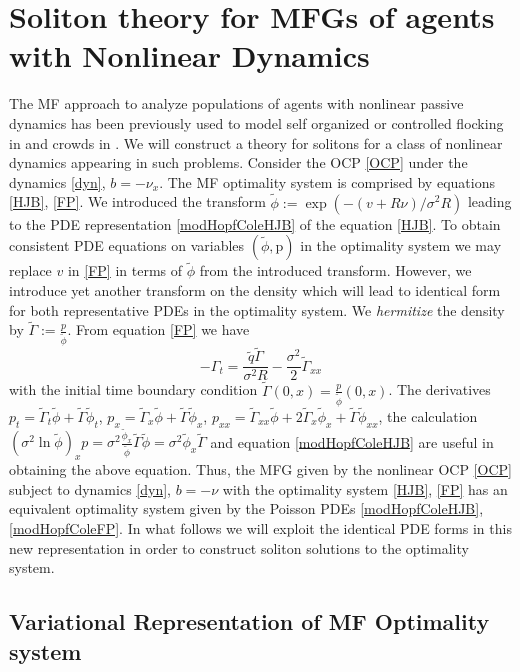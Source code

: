 \documentclass[letterpaper, 12pt]{article}
\newcommand{\rp}{{\mathrm p}}
\newcommand{\tilGamma}{\tilde{\Gamma}}
\newcommand{\tilphi}{\tilde{\phi}}
\begin{document}
\section{Soliton theory for MFGs of agents with Nonlinear Dynamics}
\label{sec:solitonnonlinearMFG}


The MF approach to analyze populations of agents with nonlinear passive dynamics has been previously used to model self organized or controlled flocking in \cite{barbaro2016phase, Bakshi2018Chaos} and crowds in \cite{Burger2011}. We will construct a theory for solitons for a class of nonlinear dynamics appearing in such problems. Consider the OCP \eqref{OCP} under the dynamics \eqref{dyn}, $b = -\nu_x$. The MF optimality system is comprised by equations \eqref{HJB}, \eqref{FP}. We introduced the transform $\tilde{\phi} := \exp(-(v + R\nu)/\sigma^2 R)$ leading to the PDE representation \eqref{modHopfColeHJB} of the equation \eqref{HJB}. To obtain consistent PDE equations on variables $(\tilde{\phi},\rp)$ in the optimality system we may replace $v$ in \eqref{FP} in terms of $\tilde{\phi}$ from the introduced transform. However, we introduce yet another transform on the density which will lead to identical form for both representative PDEs in the optimality system. We \textit{hermitize} \cite{Ullmo2017} the density by $\tilde{\Gamma} := \frac{p}{\tilde{\phi}}$. From equation \eqref{FP} we have
\begin{equation}
-\Gamma_t = \frac{\tilde{q} \tilde{\Gamma}}{\sigma^2 R} - \frac{\sigma^2}{2}\tilde{\Gamma}_{xx} \label{modHopfColeFP}
\end{equation}
with the initial time boundary condition $\tilde{\Gamma}(0,x) = \frac{p}{\tilde{\phi}}(0,x)$. The derivatives $p_t = \tilGamma_t \tilphi + \tilGamma \tilphi_t$, $p_x = \tilGamma_x \tilphi + \tilGamma \tilphi_x$, $p_{xx} = \tilGamma_{xx} \tilphi + 2 \tilGamma_x \tilphi_x + \tilGamma \tilphi_{xx}$, the calculation $(\sigma^2 \ln \tilphi)_x p = \sigma^2 \frac{\tilphi_x}{\tilphi} \tilGamma \tilphi = \sigma^2 \tilphi_x \tilGamma$ and equation \eqref{modHopfColeHJB} are useful in obtaining the above equation. Thus, the MFG given by the nonlinear OCP \eqref{OCP} subject to dynamics \eqref{dyn}, $b = -\nu$ with the optimality system \eqref{HJB}, \eqref{FP} has an equivalent optimality system given by the Poisson PDEs \eqref{modHopfColeHJB}, \eqref{modHopfColeFP}. In what follows we will exploit the identical PDE forms in this new representation in order to construct soliton solutions to the optimality system.

\subsection{Variational Representation of MF Optimality system} \label{sec:varrep}
\end{document}
